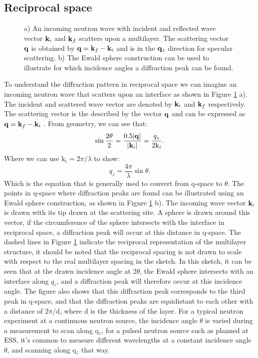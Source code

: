 \subsection{Reciprocal space}
\begin{figure}[b]
	\centering
	\def\svgwidth{\textwidth}
	
	\caption{a) An incoming neutron wave with incident and reflected wave vector $\vb{k}_i$ and $\vb{k}_f$ scatters upon a multilayer. The scattering vector $\vb{q}$ is obtained by $\vb{q} = \vb{k}_f - \vb{k}_i$ and is in the $\vb{q}_z$ direction for specular scattering. b) The Ewald sphere construction can be used to illustrate for which incidence angles a diffraction peak can be found.}
	\label{scatteringqspace}
\end{figure}
To understand the diffraction pattern in reciprocal space we can imagine an incoming neutron wave that scatters upon an interface as shown in Figure \ref{scatteringqspace} a). The incident and scattered wave vector are denoted by $\vb{k}_i$ and $\vb{k}_f$ respectively. The scattering vector is the described by the vector $\vb{q}$ and can be expressed as $\vb{q} = \vb{k}_f - \vb{k}_i$ \cite{kittel}. From geometry, we can see that:
\begin{equation}
	\sin{\frac{2\theta}{2}} = \frac{0.5\abs{\vb{q}}}{\abs{\vb{k}_i}} = \frac{q_z}{2\textrm{k}_i}.
\end{equation}
Where we can use $\textrm{k}_i = 2 \pi / \lambda$ to show:
\begin{equation}
	q_z = \frac{4\pi}{\lambda} \sin \theta.
\end{equation}
Which is the equation that is generally used to convert from q-space to $\theta$. The points in q-space where diffraction peaks are found can be illustrated using an Ewald sphere construction, as shown in Figure \ref{scatteringqspace} b). The incoming wave vector $\vb{k}_i$ is drawn with its tip drawn at the scattering site. A sphere is drawn around this vector, if the circumference of the sphere intersects with the interface in reciprocal space, a diffraction peak will occur at this distance in q-space. The dashed lines in Figure \ref{scatteringqspace} indicate the reciprocal representation of the multilayer structure, it should be noted that the reciprocal spacing is not drawn to scale with respect to the real multilayer spacing in the sketch. In this sketch, it can be seen that at the drawn incidence angle at $2\theta$, the Ewald sphere intersects with an interface along $q_z$, and a diffraction peak will therefore occur at this incidence angle. The figure also shows that this diffraction peak corresponds to the third peak in q-space, and that the diffraction peaks are equidistant to each other with a distance of $2\pi$/d, where d is the thickness of the layer. For a typical neutron experiment at a continuous neutron source, the incidence angle $\theta$ is varied during a measurement to scan along q$_z$, for a pulsed neutron source such as planned at ESS, it's common to measure different wavelengths at a constant incidence angle $\theta$, and scanning along q$_z$ that way.
\clearpage
